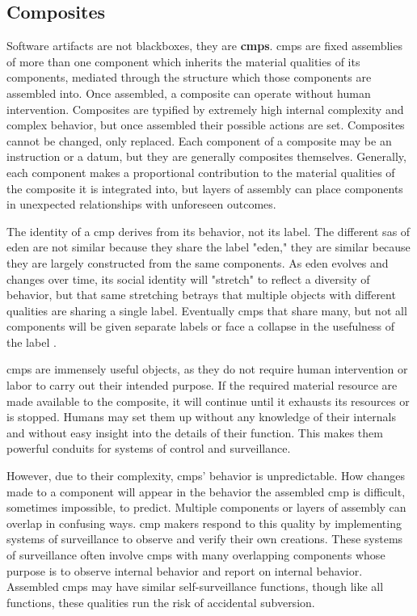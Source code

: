 \documentclass[a4paper,man,natbib,floatsintext]{apa6}
\begin{document}
  \subsection{Composites}
  Software artifacts are not blackboxes, they are \textbf{\glspl{cmp}}. \Glspl{cmp} are fixed assemblies of more than one component which inherits the material qualities of its components, mediated through the structure which those components are assembled into. Once assembled, a composite can operate without human intervention. Composites are typified by extremely high internal complexity and complex behavior, but once assembled their possible actions are set. Composites cannot be changed, only replaced. Each component of a composite may be an instruction or a datum, but they are generally composites themselves. Generally, each component makes a proportional contribution to the material qualities of the composite it is integrated into, but layers of assembly can place components in unexpected relationships with unforeseen outcomes.

  The identity of a \gls{cmp} derives from its behavior, not its label. The different \glspl{sa} of \acrshort{eden} are not similar because they share the label "eden," they are similar because they are largely constructed from the same components. As \acrshort{eden} evolves and changes over time, its social identity will "stretch" to reflect a diversity of behavior, but that same stretching betrays that multiple objects with different qualities are sharing a single label. Eventually \glspl{cmp} that share many, but not all components will be given separate labels or face a collapse in the usefulness of the label \citet{Bivens2017-tc}. 

  \Glspl{cmp} are immensely useful objects, as they do not require human intervention or labor to carry out their intended purpose. If the required material resource are made available to the composite, it will continue until it exhausts its resources or is stopped. Humans may set them up without any knowledge of their internals and without easy insight into the details of their function. This makes them powerful conduits for systems of control and surveillance. 

  However, due to their complexity, \glspl{cmp}' behavior is unpredictable. How changes made to a component will appear in the behavior the assembled \gls{cmp} is difficult, sometimes impossible, to predict. Multiple components or layers of assembly can overlap in confusing ways\footnotemark. \Gls{cmp} makers respond to this quality by implementing systems of surveillance to observe and verify their own creations. These systems of surveillance often involve \glspl{cmp} with many overlapping components whose purpose is to observe internal behavior and report on internal behavior. Assembled \glspl{cmp} may have similar self-surveillance functions, though like all functions, these qualities run the risk of accidental subversion.
\end{document}
